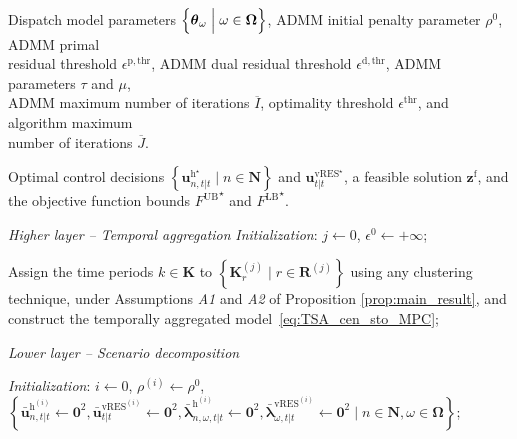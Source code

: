 \documentclass[a4paper,fleqn]{cas-sc}
\begin{document}
\begin{algorithm}[t]
\caption{Temporally Aggregated Distributed Stochastic Model Predictive Control Scheme with a Performance Guarantee}\label{alg:control_algorithm}
\begin{algorithmic}[1]
\Require \parbox[t]{\dimexpr\linewidth-\algorithmicindent}{
Dispatch model parameters $\Bigl\{ \boldsymbol{\theta}_{\omega} \;\Big|\; \omega \in \boldsymbol{\Omega} \Bigl\}$,
ADMM initial penalty parameter $\rho^0$,
ADMM primal \\ residual threshold $\epsilon^{\mathrm{p,thr}}$,
ADMM dual residual threshold $\epsilon^{\mathrm{d,thr}}$,
ADMM parameters $\tau$ and $\mu$,\\
ADMM maximum number of iterations $\overline{I}$,
optimality threshold $\epsilon^\mathrm{thr}$,
and algorithm maximum \\ number of iterations $\overline{J}$.
}

\Ensure Optimal control decisions $\left\{\boldsymbol{u}^{\boldsymbol{\mathrm{h}}^{\star}}_{n,t|t} \;\Big|\; n \in \boldsymbol{N}\right\}$
and
$\boldsymbol{u}^{\boldsymbol{\mathrm{vRES}}^{\star}}_{t|t}$, a feasible solution $\boldsymbol{z^\mathrm{f}}$, and the objective function bounds ${{F^\mathrm{UB}}}^\star$ and ${{F^\mathrm{LB}}}^\star$.

\State \textit{Higher layer -- Temporal aggregation}
\State \textit{Initialization}:
$j \gets 0$,
$\epsilon^0 \gets +\infty$;


\State \parbox[t]{\dimexpr\linewidth-\algorithmicindent}{Assign the time periods $k \in \boldsymbol{K}$ to
$\left\{\boldsymbol{K}_r^{(j)} \;\Big|\; r \in \boldsymbol{R}^{(j)}\right\}$
using any clustering technique, under Assumptions \textit{A1} and \textit{A2} of Proposition \ref{prop:main_result}, and construct the temporally aggregated model~\eqref{eq:TSA_cen_sto_MPC};}

\State \textit{Lower layer -- Scenario decomposition}

\State \textit{Initialization}:
$i \gets 0$,
$\rho^{(i)} \gets \rho^0$,
$\left\{
\boldsymbol{\bar{u}}^{\boldsymbol{\mathrm{h}}^{(i)}}_{n,t|t} \gets \boldsymbol{0}^2,
\boldsymbol{\bar{u}}^{\boldsymbol{\mathrm{vRES}}^{(i)}}_{t|t} \gets \boldsymbol{0}^2,
\boldsymbol{\bar{\lambda}}^{\boldsymbol{\mathrm{h}}^{(i)}}_{n,\omega,t|t} \gets \boldsymbol{0}^2,
\boldsymbol{\bar{\lambda}}^{\boldsymbol{\mathrm{vRES}}^{(i)}}_{\omega,t|t} \gets \boldsymbol{0}^2
\;\Big|\;
n \in \boldsymbol{N}, \omega \in \boldsymbol{\Omega}
\right\}$;


\end{algorithmic}
\end{algorithm}
\end{document}
